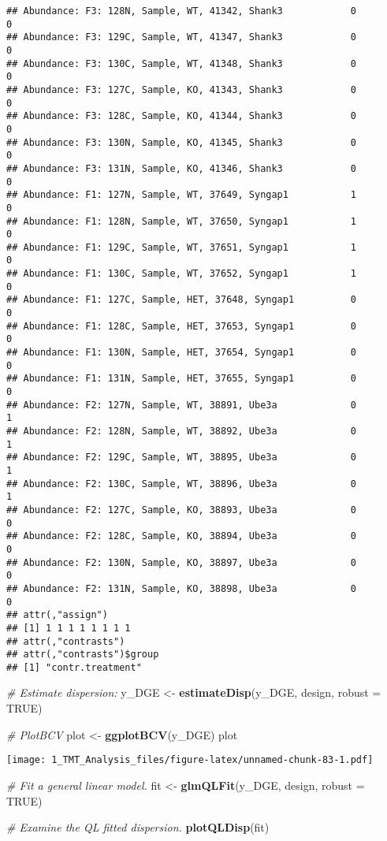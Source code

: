 \documentclass[]{article}
\newenvironment{Shaded}{\begin{snugshade}}{\end{snugshade}}
\newcommand{\KeywordTok}[1]{\textcolor[rgb]{0.13,0.29,0.53}{\textbf{#1}}}
\newcommand{\DataTypeTok}[1]{\textcolor[rgb]{0.13,0.29,0.53}{#1}}
\newcommand{\StringTok}[1]{\textcolor[rgb]{0.31,0.60,0.02}{#1}}
\newcommand{\CommentTok}[1]{\textcolor[rgb]{0.56,0.35,0.01}{\textit{#1}}}
\newcommand{\OtherTok}[1]{\textcolor[rgb]{0.56,0.35,0.01}{#1}}
\newcommand{\NormalTok}[1]{#1}
\begin{document}
\begin{verbatim}
## Abundance: F3: 128N, Sample, WT, 41342, Shank3            0        0
## Abundance: F3: 129C, Sample, WT, 41347, Shank3            0        0
## Abundance: F3: 130C, Sample, WT, 41348, Shank3            0        0
## Abundance: F3: 127C, Sample, KO, 41343, Shank3            0        0
## Abundance: F3: 128C, Sample, KO, 41344, Shank3            0        0
## Abundance: F3: 130N, Sample, KO, 41345, Shank3            0        0
## Abundance: F3: 131N, Sample, KO, 41346, Shank3            0        0
## Abundance: F1: 127N, Sample, WT, 37649, Syngap1           1        0
## Abundance: F1: 128N, Sample, WT, 37650, Syngap1           1        0
## Abundance: F1: 129C, Sample, WT, 37651, Syngap1           1        0
## Abundance: F1: 130C, Sample, WT, 37652, Syngap1           1        0
## Abundance: F1: 127C, Sample, HET, 37648, Syngap1          0        0
## Abundance: F1: 128C, Sample, HET, 37653, Syngap1          0        0
## Abundance: F1: 130N, Sample, HET, 37654, Syngap1          0        0
## Abundance: F1: 131N, Sample, HET, 37655, Syngap1          0        0
## Abundance: F2: 127N, Sample, WT, 38891, Ube3a             0        1
## Abundance: F2: 128N, Sample, WT, 38892, Ube3a             0        1
## Abundance: F2: 129C, Sample, WT, 38895, Ube3a             0        1
## Abundance: F2: 130C, Sample, WT, 38896, Ube3a             0        1
## Abundance: F2: 127C, Sample, KO, 38893, Ube3a             0        0
## Abundance: F2: 128C, Sample, KO, 38894, Ube3a             0        0
## Abundance: F2: 130N, Sample, KO, 38897, Ube3a             0        0
## Abundance: F2: 131N, Sample, KO, 38898, Ube3a             0        0
## attr(,"assign")
## [1] 1 1 1 1 1 1 1 1
## attr(,"contrasts")
## attr(,"contrasts")$group
## [1] "contr.treatment"
\end{verbatim}

\begin{Shaded}
\begin{Highlighting}[]
\CommentTok{# Estimate dispersion:}
\NormalTok{y_DGE <-}\StringTok{ }\KeywordTok{estimateDisp}\NormalTok{(y_DGE, design, }\DataTypeTok{robust =} \OtherTok{TRUE}\NormalTok{)}

\CommentTok{# PlotBCV}
\NormalTok{plot <-}\StringTok{ }\KeywordTok{ggplotBCV}\NormalTok{(y_DGE)}
\NormalTok{plot}
\end{Highlighting}
\end{Shaded}

\texttt{[image: 1\_TMT\_Analysis\_files/figure-latex/unnamed-chunk-83-1.pdf]}

\begin{Shaded}
\begin{Highlighting}[]
\CommentTok{# Fit a general linear model.}
\NormalTok{fit <-}\StringTok{ }\KeywordTok{glmQLFit}\NormalTok{(y_DGE, design, }\DataTypeTok{robust =} \OtherTok{TRUE}\NormalTok{)}

\CommentTok{# Examine the QL fitted dispersion.}
\KeywordTok{plotQLDisp}\NormalTok{(fit)}
\end{Highlighting}
\end{Shaded}
\end{document}
